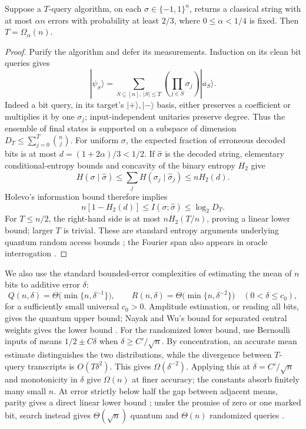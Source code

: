 \begin{lemma}\label{query:recovery}
Suppose a $T$-query algorithm, on each $\sigma\in\{-1,1\}^n$, returns a
classical string with at most $\alpha n$ errors with probability at least
$2/3$, where $0\leq\alpha<1/4$ is fixed. Then $T=\Omega_\alpha(n)$.
\end{lemma}
\begin{proof}
Purify the algorithm and defer its measurements. Induction on its clean
bit queries gives
\[
 |\psi_\sigma\rangle=
 \sum_{S\subseteq[n],\ |S|\leq T}\left(\prod_{j\in S}\sigma_j\right)|a_S\rangle.
\]
Indeed a bit query, in its target's $|+\rangle,|-\rangle$ basis, either
preserves a coefficient or multiplies it by one $\sigma_j$; input-independent
unitaries preserve degree. Thus the ensemble of final states is supported
on a subspace of dimension $D_T\leq\sum_{j=0}^T\binom nj$. For uniform
$\sigma$, the expected fraction of erroneous decoded bits is at most
$d=(1+2\alpha)/3<1/2$. If $\widehat\sigma$ is the decoded string, elementary
conditional-entropy bounds and concavity of the binary entropy $H_2$ give
\[
 H(\sigma\mid\widehat\sigma)
 \leq\sum_j H(\sigma_j\mid\widehat\sigma_j)\leq nH_2(d).
\]
Holevo's information bound therefore implies
\[
 n[1-H_2(d)]\leq I(\sigma;\widehat\sigma)\leq\log_2D_T.
\]
For $T\leq n/2$, the right-hand side is at most $nH_2(T/n)$, proving a
linear lower bound; larger $T$ is trivial. These are standard entropy
arguments underlying quantum random access bounds
\citep{Nayak1999}; the Fourier span also appears in oracle interrogation
\citep{vanDam1998}.
\end{proof}

We also use the standard bounded-error complexities of estimating
the mean of $n$ bits to additive error $\delta$:
\begin{equation}\label{query:counting}
 Q(n,\delta)=\Theta\bigl(\min\{n,\delta^{-1}\}\bigr),\qquad
 R(n,\delta)=\Theta\bigl(\min\{n,\delta^{-2}\}\bigr)
 \quad(0<\delta\leq c_0),
\end{equation}
for a sufficiently small universal $c_0>0$. Amplitude estimation, or
reading all bits, gives the quantum upper bound; Nayak and Wu's bound for
separated central weights gives the lower bound
\citep{NayakWu1999,BHMT2002}. For the randomized lower bound, use Bernoulli
inputs of means $1/2\pm C\delta$ when $\delta\geq C'/\sqrt n$.
By concentration, an accurate mean estimate distinguishes the two
distributions, while the divergence between $T$-query transcripts is
$O(T\delta^2)$. This gives $\Omega(\delta^{-2})$. Applying this at
$\delta=C'/\sqrt n$ and monotonicity in $\delta$ give $\Omega(n)$
at finer accuracy; the constants absorb finitely many small $n$. At error strictly below half the
gap between adjacent means, parity gives a direct linear lower
bound \citep{Beals2001}; under the promise of zero or one marked bit,
search instead gives $\Theta(\sqrt n)$ quantum and $\Theta(n)$
randomized queries \citep{BBBV1997,BHMT2002}.

